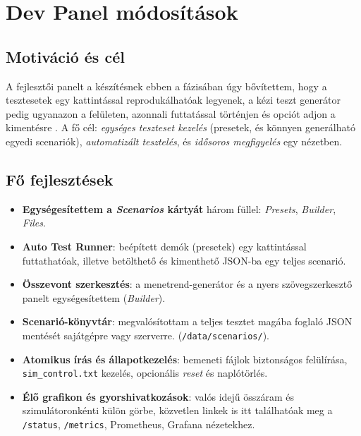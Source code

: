 
\section{Dev Panel módosítások}

\subsection{Motiváció és cél}
A fejlesztői panelt a készítésnek ebben a fázisában úgy bővítettem, hogy a tesztesetek egy 
kattintással reprodukálhatóak legyenek, a kézi teszt generátor pedig ugyanazon a felületen, 
azonnali futtatással történjen és opciót adjon a kimentésre . A fő cél: 
\emph{egységes teszteset kezelés} (presetek, és könnyen generálható egyedi scenariók), 
\emph{automatizált tesztelés}, és \emph{idősoros megfigyelés} egy nézetben.

\subsection{Fő fejlesztések}
\begin{itemize}
  \item \textbf{Egységesítettem a \emph{Scenarios} kártyát} három füllel: \emph{Presets}, 
  \emph{Builder}, \emph{Files}.
  \item \textbf{Auto Test Runner}: beépített demók (presetek) egy kattintással futtathatóak, 
  illetve betölthető és kimenthető JSON-ba egy teljes scenarió.
  \item \textbf{Összevont szerkesztés}: a menetrend-generátor és a nyers szövegszerkesztő panelt 
  egységesítettem (\emph{Builder}).
  \item \textbf{Scenarió-könyvtár}: megvalósítottam a teljes tesztet magába foglaló
  JSON mentését sajátgépre vagy szerverre. 
  (\texttt{/data/scenarios/}).
  \item \textbf{Atomikus írás és állapotkezelés}: bemeneti fájlok biztonságos felülírása, 
  \texttt{sim\_control.txt} kezelés, opcionális \emph{reset} és naplótörlés.
  \item \textbf{Élő grafikon és gyorshivatkozások}: valós idejű összáram és 
  szimulátoronkénti külön görbe, 
  közvetlen linkek is itt találhatóak meg a \texttt{/status}, 
  \texttt{/metrics}, Prometheus, Grafana nézetekhez.
\end{itemize}

